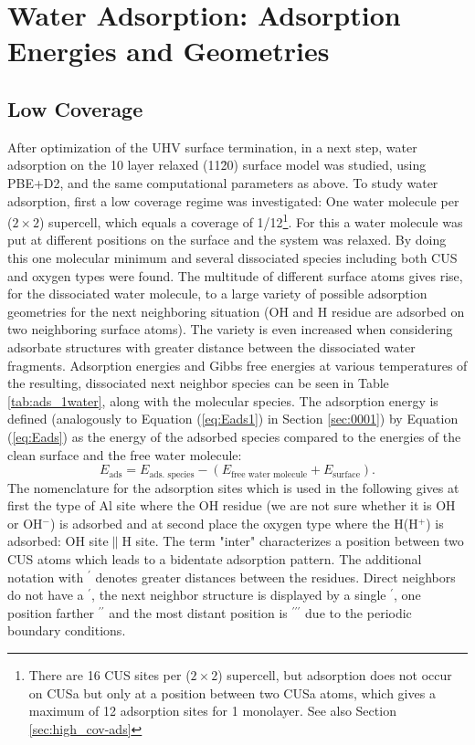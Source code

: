 \documentclass[11pt,DIV=13,BCOR=5mm,a4paper,headinclude]{scrbook}
\begin{document}
\section{Water Adsorption: Adsorption Energies and Geometries}\label{structure_search11-20}
\subsection{Low Coverage}
After optimization of the UHV surface termination, in a next step, water adsorption on the 10 layer relaxed (11\=20) surface model was studied, using PBE+D2, and the same computational parameters as above.
To study water adsorption, first a low coverage regime was investigated: One water molecule per ($2\times 2$) supercell, which equals a coverage of 1/12\footnote{There are 16 CUS sites per ($2\times 2$) supercell, but adsorption does not occur on CUSa but only at a position between two CUSa atoms, which gives a maximum of 12 adsorption sites for 1 monolayer. See also Section \ref{sec:high_cov-ads}}.
For this a water molecule was put at different positions on the surface and the system was relaxed.
By doing this one molecular minimum and several dissociated species including both CUS and oxygen types were found.
The multitude of different surface atoms gives rise, for the dissociated water molecule, to a large variety of possible adsorption geometries for the next neighboring situation (OH and H residue are adsorbed on two neighboring surface atoms).
The variety is even increased when considering adsorbate structures with greater distance between the dissociated water fragments.
Adsorption energies and Gibbs free energies at various temperatures of the resulting, dissociated next neighbor species can be seen in Table \ref{tab:ads_1water}, along with the molecular species.
The adsorption energy is defined (analogously to Equation (\ref{eq:Eads1}) in Section \ref{sec:0001}) by Equation (\ref{eq:Eads}) as the energy of the adsorbed species compared to the energies of the clean surface and the free water molecule:
\begin{equation}\label{eq:Eads}
 E_\textrm{ads}=E_\textrm{ads. species}-(E_\text{free water molecule}+E_\text{surface}).
\end{equation}
The nomenclature for the adsorption sites which is used in the following gives at first the type of Al site where the OH residue (we are not sure whether it is OH or OH$^-$) is adsorbed and at second place the oxygen type where the H(H$^+$) is adsorbed: OH site$\parallel$H site.
The term "inter" characterizes a position between two CUS atoms which leads to a bidentate adsorption pattern.
The additional notation with $^\prime$ denotes greater distances between the residues.
Direct neighbors do not have a $^\prime$, the next neighbor structure is displayed by a single $^\prime$, one position farther $^{\prime\prime}$ and the most distant position is $^{\prime\prime\prime}$ due to the periodic boundary conditions.
\end{document}
